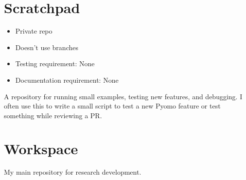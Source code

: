 \documentclass{article}
\begin{document}
\section{Scratchpad}
\begin{itemize}
  \item Private repo
  \item Doesn't use branches
  \item Testing requirement: None
  \item Documentation requirement: None
\end{itemize}
A repository for running small examples, testing new features, and
debugging. I often use this to write a small script to test a new
Pyomo feature or test something while reviewing a PR.

\section{Workspace}
My main repository for research development.
\end{document}
